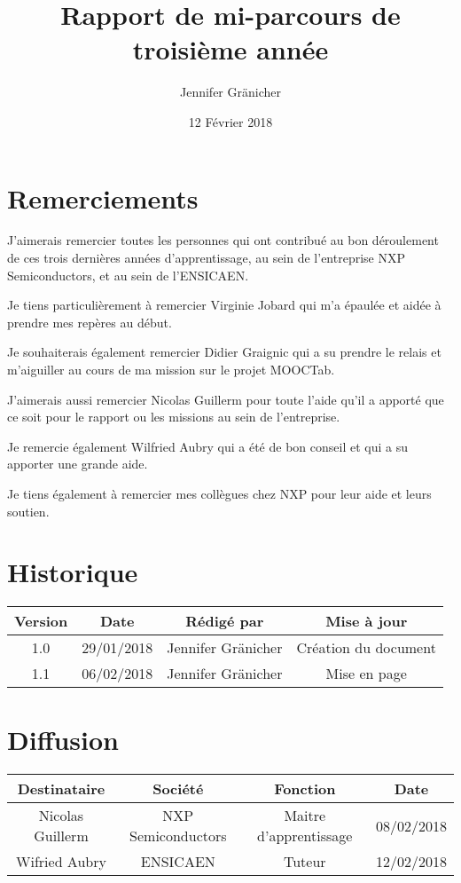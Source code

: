 \documentclass[french,12pt,a4paper,titlepage,openright,openbib]{report}
\begin{document}
\title{Rapport de mi-parcours de troisième année}
\author{Jennifer Gr\"{a}nicher}
\date{12 Février 2018}
\maketitle

\chapter*{Remerciements}

J'aimerais remercier toutes les personnes qui ont contribué au bon déroulement de ces trois dernières années d'apprentissage, au sein de l'entreprise NXP Semiconductors, et au sein de l'ENSICAEN.

Je tiens particulièrement à remercier Virginie Jobard qui m'a épaulée et aidée à prendre mes repères au début.

Je souhaiterais également remercier Didier Graignic qui a su prendre le relais et m'aiguiller au cours de ma mission sur le projet MOOCTab.

J'aimerais aussi remercier Nicolas Guillerm pour toute l'aide qu'il a apporté que ce soit pour le rapport ou les missions au sein de l'entreprise.

Je remercie également Wilfried Aubry qui a été de bon conseil et qui a su apporter une grande aide.

Je tiens également à remercier mes collègues chez NXP pour leur aide et leurs soutien.


\tableofcontents

\chapter*{Historique}
\begin{table}[ht]
	\label{tab:historique}
	\centering
	\begin{tabular}{|c|c|c|c|}
		\hline
		{\bf Version} & {\bf Date} & {\bf Rédigé par}    & {\bf Mise à jour}    \\
		\hline
		1.0           & 29/01/2018 & Jennifer Gränicher  & Création du document \\
		\hline
		1.1           & 06/02/2018 & Jennifer Gränicher  & Mise en page \\
		\hline
	\end{tabular}
\end{table}

{\let \clearpage \relax \chapter*{Diffusion}}
\begin{table}[ht]
	\label{tab:diffusion}
	\centering
	\begin{tabular}{|c|c|c|c|}
		\hline
		{\bf Destinataire} & {\bf Société}      & {\bf Fonction}   		 & {\bf Date}\\
		\hline
		Nicolas Guillerm   & NXP Semiconductors & Maitre d'apprentissage & 08/02/2018 \\
		\hline
		Wifried Aubry      & ENSICAEN 			& Tuteur				 & 12/02/2018 \\
		\hline
	\end{tabular}
\end{table}
\end{document}
